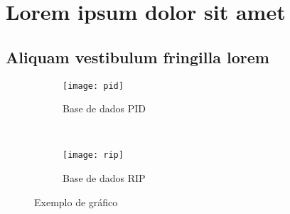 \chapter{Lorem ipsum dolor sit amet}\label{cap:exampleChapter}
\section{Aliquam vestibulum fringilla lorem}

\lipsum[1]



\lipsum[2-3]


\lipsum[2-3]
\begin{figure}
    \centering
    \begin{subfigure}[b]{0.45\textwidth}
        \texttt{[image: pid]}
        \caption{Base de dados PID}
        \label{fig:pid}
    \end{subfigure}
    ~ 
    \begin{subfigure}[b]{0.45\textwidth}
        \texttt{[image: rip]}
        \caption{Base de dados RIP}
        \label{fig:rip}
    \end{subfigure}
    \caption{Exemplo de gráfico}\label{fig:animals}
\end{figure}
\lipsum[1]